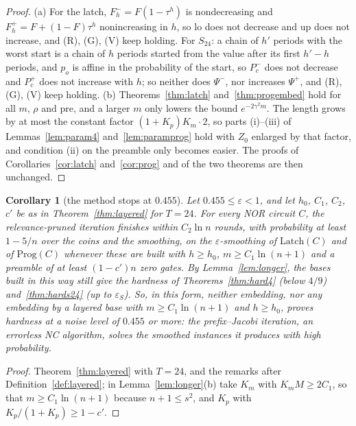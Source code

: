 \documentclass[11pt]{amsart}
\newtheorem{corollary}[theorem]{Corollary}
\theoremstyle{definition}
\theoremstyle{remark}
\newcommand{\eps}{\varepsilon}
\begin{document}
\begin{proof}
(a) For the latch, $F^-_h=F(1-\tau^h)$ is nondecreasing and $F^+_h=F+(1-F)\tau^h$ nonincreasing in
$h$, so $\mathrm{lo}$ does not decrease and $\mathrm{up}$ does not increase, and (R), (G), (V) keep
holding. For $S_{24}$: a chain of $h'$ periods with the worst start is a chain of $h$ periods
started from the value after its first $h'-h$ periods, and $p_o$ is affine in the probability of
the start, so $P^-_c$ does not decrease and $P^+_c$ does not increase with $h$; so neither does
$\Psi^-$, nor increases $\Psi^+$, and (R), (G), (V) keep holding.
(b) Theorems~\ref{thm:latch} and~\ref{thm:progembed} hold for all $m$, $\rho$ and $\mathrm{pre}$,
and a larger $m$ only lowers the bound $e^{-2\gamma^2m}$. The length grows by at most the constant
factor $(1+K_p)K_m\cdot2$, so parts (i)--(iii) of Lemmas~\ref{lem:param4} and~\ref{lem:paramprog} hold
with $Z_0$ enlarged by that factor, and condition (ii) on the preamble only becomes easier. The proofs
of Corollaries~\ref{cor:latch} and~\ref{cor:prog} and of the two theorems are then unchanged.
\end{proof}

\begin{corollary}[the method stops at $0.455$]\label{cor:layered}
Let $0.455\le\eps<1$, and let $h_0$, $C_1$, $C_2$, $c'$ be as in Theorem~\ref{thm:layered} for
$T=24$. For every NOR circuit $C$, the relevance-pruned iteration finishes within $C_2\ln n$ rounds,
with probability at least $1-5/n$ over the coins and the smoothing, on the $\eps$-smoothing of
$\mathrm{Latch}(C)$ and of $\mathrm{Prog}(C)$ whenever these are built with $h\ge h_0$,
$m\ge C_1\ln(n+1)$ and a preamble of at least $(1-c')n$ zero gates. By Lemma~\ref{lem:longer}, the
bases built in this way still give the hardness of Theorems~\ref{thm:hard4} (below $4/9$)
and~\ref{thm:hards24} (up to $\eps_S$). So, in this form, neither embedding, nor any embedding by a
layered base with $m\ge C_1\ln(n+1)$ and $h\ge h_0$, proves hardness at a noise level of $0.455$ or
more: the prefix--Jacobi iteration, an errorless NC algorithm, solves the smoothed instances it
produces with high probability.
\end{corollary}

\begin{proof}
Theorem~\ref{thm:layered} with $T=24$, and the remarks after Definition~\ref{def:layered}; in
Lemma~\ref{lem:longer}(b) take $K_m$ with $K_mM\ge2C_1$, so that $m\ge C_1\ln(n+1)$ because
$n+1\le s^2$, and $K_p$ with $K_p/(1+K_p)\ge1-c'$.
\end{proof}
\end{document}
